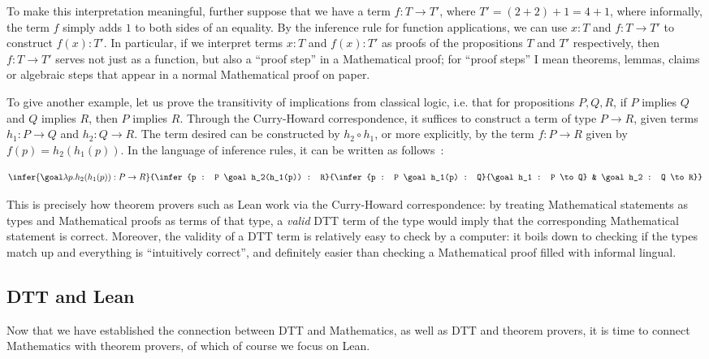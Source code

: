 To make this interpretation meaningful, further suppose that we have a term \(f : T \to T'\), where \(T' = (2 + 2) + 1 = 4 + 1\), where informally, the term \(f\) simply adds \(1\) to both sides of an equality. By the inference rule for function applications, we can use \(x : T\) and \(f : T \to T'\) to construct \(f(x) : T'\). In particular, if we interpret terms \(x : T\) and \(f(x) : T'\) as proofs of the propositions \(T\) and \(T'\) respectively, then \(f : T \to T'\) serves not just as a function, but also a ``proof step'' in a Mathematical proof; for ``proof steps'' I mean theorems, lemmas, claims or algebraic steps that appear in a normal Mathematical proof on paper.

To give another example, let us prove the transitivity of implications from classical logic, i.e. that for propositions \(P, Q, R\), if \(P\) implies \(Q\) and \(Q\) implies \(R\), then \(P\) implies \(R\). Through the Curry-Howard correspondence, it suffices to construct a term of type \(P \to R\), given terms \(h_1 : P \to Q\) and \(h_2 : Q \to R\). The term desired can be constructed by \(h_2 \circ h_1\), or more explicitly, by the term \(f : P \to R\) given by \(f(p) = h_2(h_1(p))\). In the language of inference rules, it can be written as follows~\label{ch-tree}:

\[
  \infer{\goal \lambda p. h_2(h_1(p)) : P \to R}{\infer{p : P \goal h_2(h_1(p)) : R}{\infer{p : P \goal h_1(p) : Q}{\goal h_1 : P \to Q} & \goal h_2 : Q \to R}}
\]

This is precisely how theorem provers such as Lean work via the Curry-Howard correspondence: by treating Mathematical statements as types and Mathematical proofs as terms of that type, a \textit{valid} DTT term of the type would imply that the corresponding Mathematical statement is correct. Moreover, the validity of a DTT term is relatively easy to check by a computer: it boils down to checking if the types match up and everything is ``intuitively correct'', and definitely easier than checking a Mathematical proof filled with informal lingual.

\subsection{DTT and Lean}

Now that we have established the connection between DTT and Mathematics, as well as DTT and theorem provers, it is time to connect Mathematics with theorem provers, of which of course we focus on Lean.

